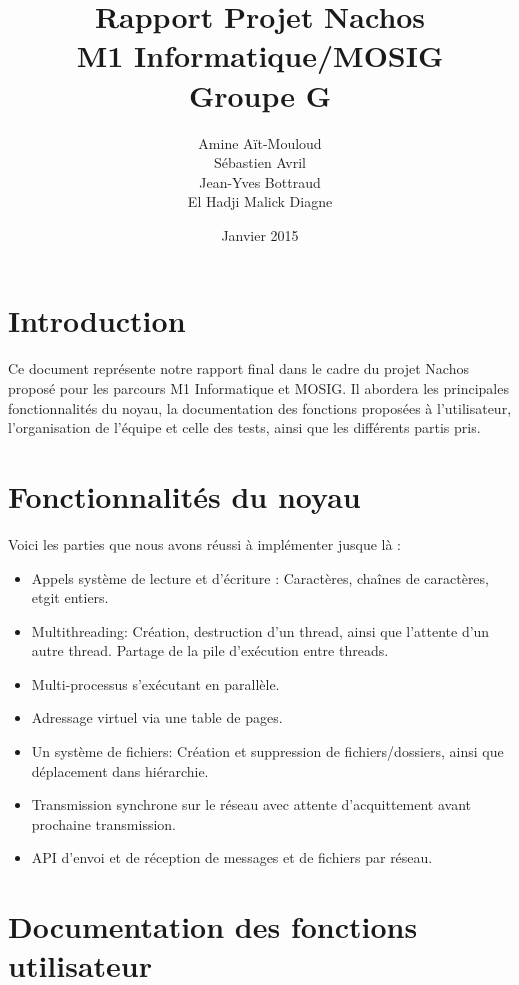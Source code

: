 \documentclass{article}
\title {\vspace*{\fill}Rapport Projet Nachos \\ M1 Informatique/MOSIG \\ Groupe G}
\author{Amine Aït-Mouloud\\ Sébastien Avril\\ Jean-Yves Bottraud\\ El Hadji Malick Diagne}
\date{Janvier 2015\vspace*{\fill}}
\begin{document}
\maketitle

\newpage
\tableofcontents
\newpage
\section{Introduction}
	Ce document représente notre rapport final dans le cadre du projet Nachos proposé pour les parcours M1 Informatique et MOSIG.
	Il abordera les principales fonctionnalités du noyau, la documentation des fonctions proposées à l'utilisateur, l'organisation de l'équipe et celle des tests, ainsi que les différents partis pris.

\section{Fonctionnalités du noyau}
	Voici les parties que nous avons réussi à implémenter jusque là :
	\begin{itemize}
		\item Appels système de lecture et d'écriture : Caractères, chaînes de caractères, etgit entiers.
		\item Multithreading: Création, destruction d'un thread, ainsi que l'attente d'un autre thread. Partage de la pile d'exécution entre threads.
		\item Multi-processus s'exécutant en parallèle. 
		\item Adressage virtuel via une table de pages.
		\item Un système de fichiers: Création et suppression de fichiers/dossiers, ainsi que déplacement dans hiérarchie.
		\item Transmission synchrone sur le réseau avec attente d'acquittement avant prochaine transmission.
		\item API d'envoi et de réception de messages et de fichiers par réseau. 
	\end{itemize}

\section{Documentation des fonctions utilisateur}
\end{document}
